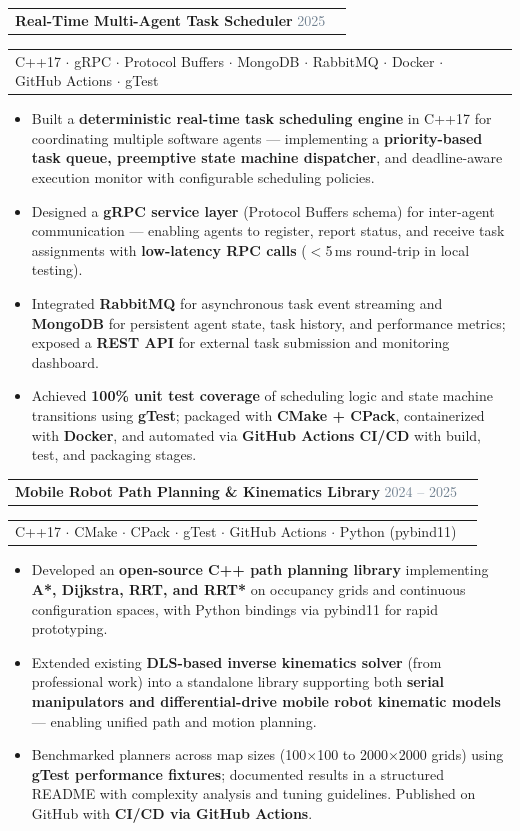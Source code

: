 \documentclass[a4paper,10pt]{article}
\makeatletter
\newcommand{\resumeProjectHeading}[2]{
  \vspace{-2pt}\item[]
  \begin{tabular*}{\textwidth}{l@{\extracolsep{\fill}}r}
    \small #1 & {\color{SlateGray}\small #2} \\
  \end{tabular*}\vspace{-5pt}
}
\newcommand{\resumeItem}[1]{
  \item\small{#1\vspace{-2pt}}
}
\newcommand{\resumeItemListStart}{\begin{itemize}[leftmargin=0.18in, itemsep=0.5pt, topsep=2pt]}
\newcommand{\resumeItemListEnd}{\end{itemize}\vspace{-3pt}}
\makeatother
\begin{document}
  \resumeProjectHeading
    {\textbf{\color{DarkNavy}Real-Time Multi-Agent Task Scheduler} \hfill \textcolor{SlateGray}{\small 2025}}{}
  \vspace{-10pt}
  \resumeProjectHeading
    {\textcolor{MidBlue}{\small C++17 $\cdot$ gRPC $\cdot$ Protocol Buffers $\cdot$ MongoDB $\cdot$ RabbitMQ $\cdot$ Docker $\cdot$ GitHub Actions $\cdot$ gTest}}{}
  \resumeItemListStart
    \resumeItem{Built a \textbf{deterministic real-time task scheduling engine} in C++17 for coordinating multiple software agents — implementing a \textbf{priority-based task queue, preemptive state machine dispatcher}, and deadline-aware execution monitor with configurable scheduling policies.}
    \resumeItem{Designed a \textbf{gRPC service layer} (Protocol Buffers schema) for inter-agent communication — enabling agents to register, report status, and receive task assignments with \textbf{low-latency RPC calls} ($<$5\,ms round-trip in local testing).}
    \resumeItem{Integrated \textbf{RabbitMQ} for asynchronous task event streaming and \textbf{MongoDB} for persistent agent state, task history, and performance metrics; exposed a \textbf{REST API} for external task submission and monitoring dashboard.}
    \resumeItem{Achieved \textbf{100\% unit test coverage} of scheduling logic and state machine transitions using \textbf{gTest}; packaged with \textbf{CMake + CPack}, containerized with \textbf{Docker}, and automated via \textbf{GitHub Actions CI/CD} with build, test, and packaging stages.}
  \resumeItemListEnd

  \vspace{3pt}

  \resumeProjectHeading
    {\textbf{\color{DarkNavy}Mobile Robot Path Planning \& Kinematics Library} \hfill \textcolor{SlateGray}{\small 2024 -- 2025}}{}
  \vspace{-10pt}
  \resumeProjectHeading
    {\textcolor{MidBlue}{\small C++17 $\cdot$ CMake $\cdot$ CPack $\cdot$ gTest $\cdot$ GitHub Actions $\cdot$ Python (pybind11)}}{}
  \resumeItemListStart
    \resumeItem{Developed an \textbf{open-source C++ path planning library} implementing \textbf{A*, Dijkstra, RRT, and RRT*} on occupancy grids and continuous configuration spaces, with Python bindings via pybind11 for rapid prototyping.}
    \resumeItem{Extended existing \textbf{DLS-based inverse kinematics solver} (from professional work) into a standalone library supporting both \textbf{serial manipulators and differential-drive mobile robot kinematic models} — enabling unified path and motion planning.}
    \resumeItem{Benchmarked planners across map sizes (100$\times$100 to 2000$\times$2000 grids) using \textbf{gTest performance fixtures}; documented results in a structured README with complexity analysis and tuning guidelines. Published on GitHub with \textbf{CI/CD via GitHub Actions}.}
  \resumeItemListEnd
\end{document}
